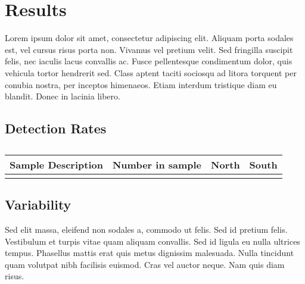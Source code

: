 \documentclass[usenatbib]{mnras}
\begin{document}


\section{Results}
 Lorem ipsum dolor sit amet, consectetur adipiscing elit. Aliquam porta sodales est, vel cursus risus porta non. Vivamus vel pretium velit. Sed fringilla suscipit felis, nec iaculis lacus convallis ac. Fusce pellentesque condimentum dolor, quis vehicula tortor hendrerit sed. Class aptent taciti sociosqu ad litora torquent per conubia nostra, per inceptos himenaeos. Etiam interdum tristique diam eu blandit. Donec in lacinia libero.

\subsection{Detection Rates}
\begin{table}
  \begin{center}
    \setlength{\tabcolsep}{4pt}
    \begin{tabular}{lrrr}
      Sample Description  & Number in sample & North & South   \\
      \hline
      \label{tab:The_Numbers}
    \end{tabular}
    \caption{}
  \end{center}
\end{table}

\subsection{Variability}
Sed elit massa, eleifend non sodales a, commodo ut felis. Sed id pretium felis. Vestibulum et turpis vitae quam aliquam convallis. Sed id ligula eu nulla ultrices tempus. Phasellus mattis erat quis metus dignissim malesuada. Nulla tincidunt quam volutpat nibh facilisis euismod. Cras vel auctor neque. Nam quis diam risus.
\end{document}

